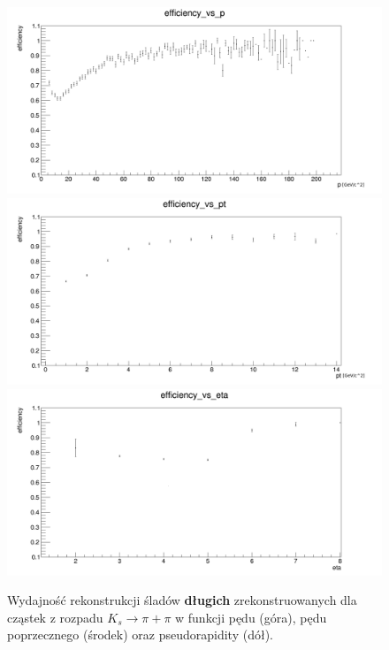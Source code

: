 \begin{figure}[H]
\centering
\includegraphics[scale=0.3]{rozdzial6/KsLL_p.png} \\
\includegraphics[scale=0.3]{rozdzial6/KsLL_pt.png} \\
\includegraphics[scale=0.3]{rozdzial6/KsLL_eta.png} \\ 
\caption{Wydajność rekonstrukcji śladów \textbf{długich} zrekonstruowanych dla cząstek z rozpadu $K_s \rightarrow \pi + \pi $  w funkcji pędu (góra), pędu poprzecznego (środek) oraz pseudorapidity (dół).}
\label{KsLL}
\end{figure}

